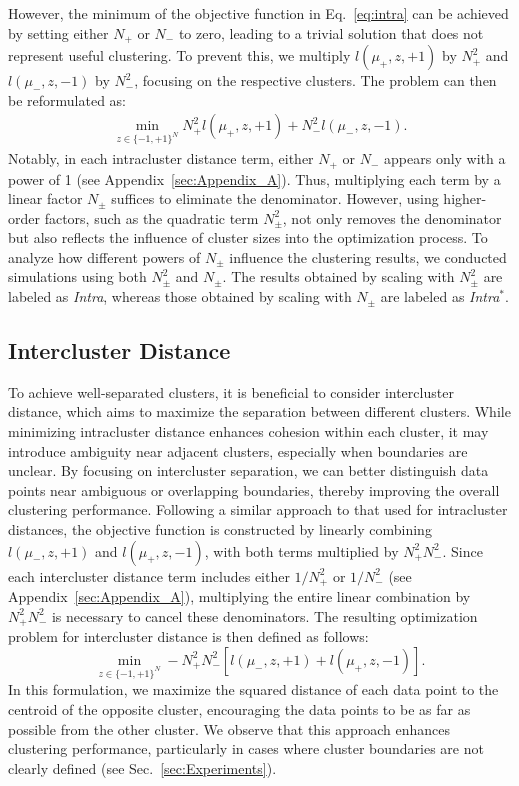 \documentclass[showpacs,twocolumn,superscriptaddress]{revtex4-2}
\begin{document}
However, the minimum of the objective function in Eq.~\eqref{eq:intra} can be achieved by setting either $N_+$ or $N_-$ to zero, leading to a trivial solution that does not represent useful clustering. To prevent this, we multiply $l(\mu_{+},z,+1)$ by $N_{+}^2$ and $l(\mu_{-},z,-1)$ by $N_{-}^2$, focusing on the respective clusters. The problem can then be reformulated as:
\begin{align}
    \label{eq:intra2}
    \min_{z \in \{-1,+1\}^N} N_+^2 l(\mu_{+},z,+1) + N_-^2 l(\mu_{-},z,-1).
\end{align}
Notably, in each intracluster distance term, either $N_+$ or $N_-$ appears only with a power of 1 (see Appendix~\ref{sec:Appendix_A}). Thus, multiplying each term by a linear factor $N_{\pm}$ suffices to eliminate the denominator. However, using higher-order factors, such as the quadratic term $N_{\pm}^2$, not only removes the denominator but also reflects the influence of cluster sizes into the optimization process. 
To analyze how different powers of $N_{\pm}$ influence the clustering results, we conducted simulations using both $N_{\pm}^2$ and $N_{\pm}$. The results obtained by scaling with $N_{\pm}^2$ are labeled as \textit{Intra}, whereas those obtained by scaling with $N_{\pm}$ are labeled as \textit{Intra}$^*$.

\subsection{Intercluster Distance}
\label{sec:inter}
To achieve well-separated clusters, it is beneficial to consider intercluster distance, which aims to maximize the separation between different clusters. While minimizing intracluster distance enhances cohesion within each cluster, it may introduce ambiguity near adjacent clusters, especially when boundaries are unclear. By focusing on intercluster separation, we can better distinguish data points near ambiguous or overlapping boundaries, thereby improving the overall clustering performance. Following a similar approach to that used for intracluster distances, the objective function is constructed by linearly combining $l(\mu_-,z,+1)$ and $l(\mu_+,z,-1)$, with both terms multiplied by $N_{+}^2N_{-}^2$. Since each intercluster distance term includes either $1/N_+^2$ or $1/N_-^2$ (see Appendix~\ref{sec:Appendix_A}), multiplying the entire linear combination by $N_{+}^2N_{-}^2$ is necessary to cancel these denominators. The resulting optimization problem for intercluster distance is then defined as follows:
\begin{equation}
    \label{eq:inter}
    \min_{z \in \{-1,+1\}^N} - N_{+}^2N_{-}^2 \left[l(\mu_-,z,+1) + l(\mu_+,z,-1)\right].
\end{equation}
In this formulation, we maximize the squared distance of each data point to the centroid of the opposite cluster, encouraging the data points to be as far as possible from the other cluster. We observe that this approach enhances clustering performance, particularly in cases where cluster boundaries are not clearly defined (see Sec.~\ref{sec:Experiments}). 
\end{document}

